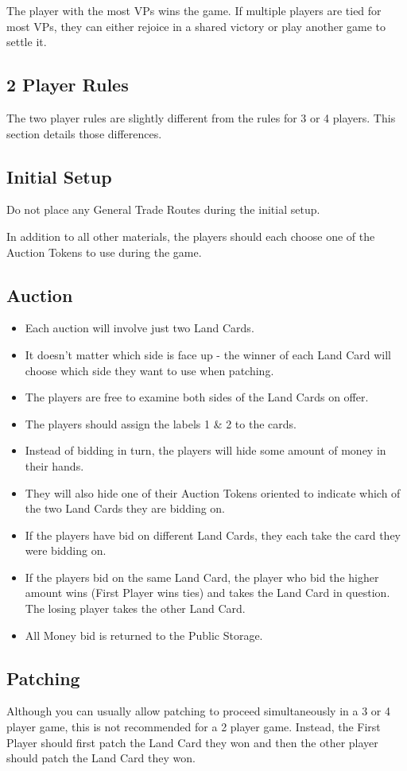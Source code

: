 \documentclass[10pt,twocolumn]{article}
\begin{document}
The player with the most VPs wins the game. If multiple players are tied for most VPs, they can either rejoice in a shared victory or play another game to settle it.
\begin{appendices}
\section{2 Player Rules}
The two player rules are slightly different from the rules for 3 or 4 players. This section details those differences.
\subsection{Initial Setup}
Do not place any General Trade Routes during the initial setup.

In addition to all other materials, the players should each choose one of the Auction Tokens to use during the game.
\subsection{Auction}
\begin{itemize}
\item Each auction will involve just two Land Cards.
\item It doesn't matter which side is face up - the winner of each Land Card will choose which side they want to use when patching.
\item The players are free to examine both sides of the Land Cards on offer.
\item The players should assign the labels 1 \& 2 to the cards.
\item Instead of bidding in turn, the players will hide some amount of money in their hands.
\item They will also hide one of their Auction Tokens oriented to indicate which of the two Land Cards they are bidding on.
\item If the players have bid on different Land Cards, they each take the card they were bidding on.
\item If the players bid on the same Land Card, the player who bid the higher amount wins (First Player wins ties) and takes the Land Card in question. The losing player takes the other Land Card.
\item All Money bid is returned to the Public Storage.
\end{itemize}
\subsection{Patching}
Although you can usually allow patching to proceed simultaneously in a 3 or 4 player game, this is not recommended for a 2 player game. Instead, the First Player should first patch the Land Card they won and then the other player should patch the Land Card they won.

\end{appendices}
\end{document}
